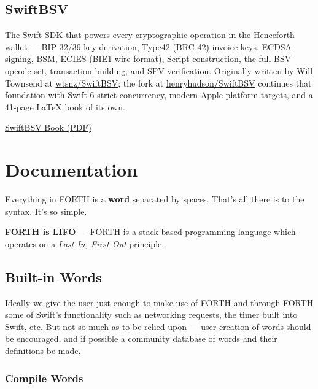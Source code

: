 \documentclass[a4paper, 11pt, openany]{book}
\begin{document}
\section{SwiftBSV}

The Swift SDK that powers every cryptographic operation in the Henceforth wallet --- BIP-32/39 key derivation, Type42 (BRC-42) invoice keys, ECDSA signing, BSM, ECIES (BIE1 wire format), Script construction, the full BSV opcode set, transaction building, and SPV verification. Originally written by Will Townsend at \href{https://github.com/wtsnz/SwiftBSV}{wtsnz/SwiftBSV}; the fork at \href{https://github.com/henryhudson/SwiftBSV}{henryhudson/SwiftBSV} continues that foundation with Swift 6 strict concurrency, modern Apple platform targets, and a 41-page LaTeX book of its own.

\href{https://github.com/henryhudson/SwiftBSV/blob/main/Documentation/swiftbsv.pdf}{SwiftBSV Book (PDF)}

\chapter{Documentation}

Everything in FORTH is a \textbf{word} separated by spaces. That's all there is to the syntax. It's so simple.

\begin{notebox}
\textbf{FORTH is LIFO} --- FORTH is a stack-based programming language which operates on a \emph{Last In, First Out} principle.
\end{notebox}

\section{Built-in Words}

Ideally we give the user just enough to make use of FORTH and through FORTH some of Swift's functionality such as networking requests, the timer built into Swift, etc. But not so much as to be relied upon --- user creation of words should be encouraged, and if possible a community database of words and their definitions be made.

\subsection{Compile Words}
\end{document}
